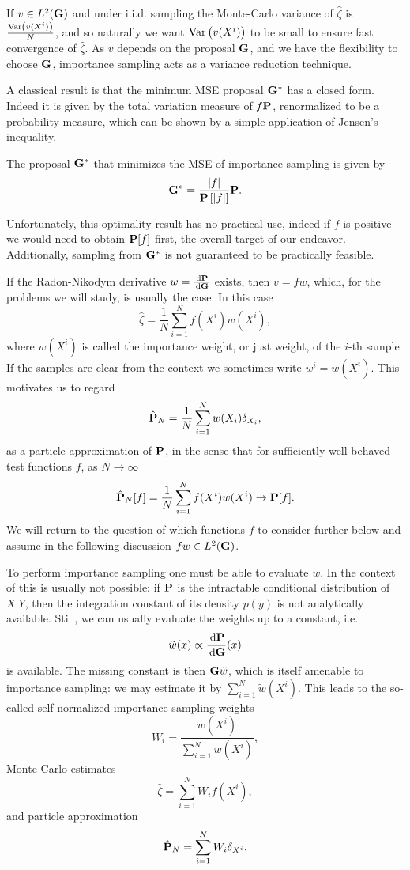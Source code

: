 If $v \in L^{2}(\G)$ and under i.i.d. sampling the Monte-Carlo variance of $\hat \zeta$ is $\frac{\var \left(v(X^{i})\right)}{N}$, and so naturally we want $\var \left(v(X^{i})\right)$ to be small to ensure fast convergence of $\hat \zeta$. As $v$ depends on the proposal $\G$, and we have the flexibility to choose $\G$, importance sampling acts as a variance reduction technique. 

A classical result is that the minimum MSE proposal $\G^\ast$ has a closed form. Indeed it is given by the total variation measure of $f\P$, renormalized to be a probability measure, which can be shown by a simple application of Jensen's inequality. 
\begin{proposition}
    \label{prop:minimum_MSE_IS}
    The proposal $\G^{\ast}$ that minimizes the MSE of importance sampling is given by
    $$
    \G^{\ast}  = \frac{\lvert f \rvert}{\P\left[\lvert f \rvert \right]} \P.
    $$
\end{proposition}
Unfortunately, this optimality result has no practical use, indeed if $f$ is positive we would need to obtain $\P[f]$ first, the overall target of our endeavor. Additionally, sampling from $\G^{\ast}$ is not guaranteed to be practically feasible. 

If the Radon-Nikodym derivative $w = \frac{\d\P}{\d\G}$ exists, then $v = fw$, which, for the problems we will study, is usually the case. In this case 
$$
\hat \zeta = \frac{1}{N} \sum_{i = 1}^N f(X^{i})w(X^{i}),
$$
where $w(X^{i})$ is called the importance weight, or just weight, of the $i$-th sample. If the samples are clear from the context we sometimes write $w^{i} = w(X^{i})$. 
This motivates us to regard
\begin{align}
\label{eq:is-particle-approximation}
\hat \P_N = \frac{1}{N} \sum_{i = 1}^{N} w(X_i) \delta_{X_i},
\end{align}
as a particle approximation of $\P$, in the sense that for sufficiently well behaved test functions $f$, as $N \to \infty$ $$
\hat\P_{N}[f] = \frac{1}{N} \sum_{i = 1}^N f(X^{i})w(X^{i})\to \P [f].
$$
We will return to the question of which functions $f$ to consider further below and assume in the following discussion $fw \in L^{2}(\G)$.

To perform importance sampling one must be able to evaluate $w$. In the context of  this is usually not possible: if $\P$ is the intractable conditional distribution of $X|Y$, then the integration constant of its density $p(y)$ is not analytically available.
Still, we can usually evaluate the weights up to a constant, i.e. $$\tilde w(x) \propto \frac{\d \P}{\d \G}(x)$$ is available. The missing constant is then $\G \tilde w$, which is itself amenable to importance sampling: we may estimate it by $\sum_{i = 1}^N \tilde w(X^{i})$.
This leads to the so-called self-normalized importance sampling weights 
$$W_i = \frac{w(X^i)}{\sum_{i = 1}^N w(X^i)},$$
Monte Carlo estimates 
$$\hat \zeta = \sum_{i = 1}^{N} W_i f(X^i),$$
and particle approximation 
$$\hat \P_N = \sum_{i = 1}^{N} W_i \delta_{X^i}.$$

